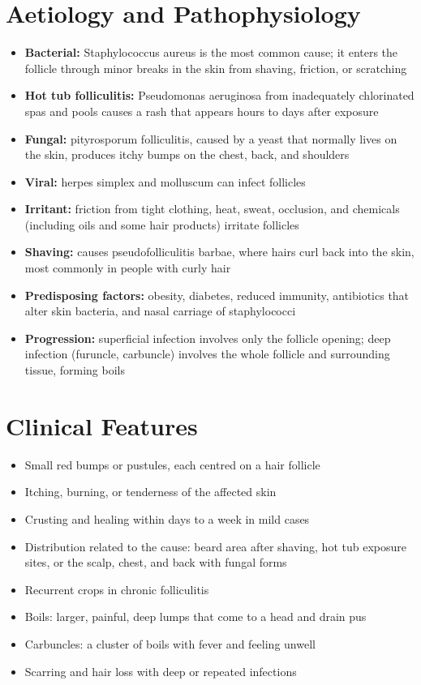 \section*{Aetiology and Pathophysiology}
\begin{itemize}
    \item \textbf{Bacterial:} Staphylococcus aureus is the most common cause; it enters the follicle through minor breaks in the skin from shaving, friction, or scratching
    \item \textbf{Hot tub folliculitis:} Pseudomonas aeruginosa from inadequately chlorinated spas and pools causes a rash that appears hours to days after exposure
    \item \textbf{Fungal:} pityrosporum folliculitis, caused by a yeast that normally lives on the skin, produces itchy bumps on the chest, back, and shoulders
    \item \textbf{Viral:} herpes simplex and molluscum can infect follicles
    \item \textbf{Irritant:} friction from tight clothing, heat, sweat, occlusion, and chemicals (including oils and some hair products) irritate follicles
    \item \textbf{Shaving:} causes pseudofolliculitis barbae, where hairs curl back into the skin, most commonly in people with curly hair
    \item \textbf{Predisposing factors:} obesity, diabetes, reduced immunity, antibiotics that alter skin bacteria, and nasal carriage of staphylococci
    \item \textbf{Progression:} superficial infection involves only the follicle opening; deep infection (furuncle, carbuncle) involves the whole follicle and surrounding tissue, forming boils
\end{itemize}

\section*{Clinical Features}
\begin{itemize}
    \item Small red bumps or pustules, each centred on a hair follicle
    \item Itching, burning, or tenderness of the affected skin
    \item Crusting and healing within days to a week in mild cases
    \item Distribution related to the cause: beard area after shaving, hot tub exposure sites, or the scalp, chest, and back with fungal forms
    \item Recurrent crops in chronic folliculitis
    \item Boils: larger, painful, deep lumps that come to a head and drain pus
    \item Carbuncles: a cluster of boils with fever and feeling unwell
    \item Scarring and hair loss with deep or repeated infections
\end{itemize}

